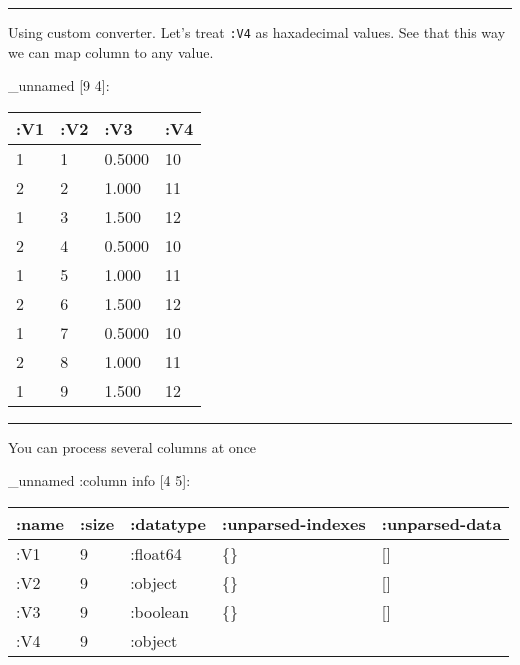 \documentclass[]{article}
\newenvironment{Shaded}{\begin{snugshade}}{\end{snugshade}}
\newcommand{\KeywordTok}[1]{\textcolor[rgb]{0.13,0.29,0.53}{\textbf{#1}}}
\newcommand{\DecValTok}[1]{\textcolor[rgb]{0.00,0.00,0.81}{#1}}
\newcommand{\FloatTok}[1]{\textcolor[rgb]{0.00,0.00,0.81}{#1}}
\newcommand{\VariableTok}[1]{\textcolor[rgb]{0.00,0.00,0.00}{#1}}
\newcommand{\AttributeTok}[1]{\textcolor[rgb]{0.77,0.63,0.00}{#1}}
\newcommand{\NormalTok}[1]{#1}
\begin{document}
\begin{center}\rule{0.5\linewidth}{0.5pt}\end{center}

Using custom converter. Let's treat \texttt{:V4} as haxadecimal values.
See that this way we can map column to any value.

\begin{Shaded}
\end{Shaded}

\_unnamed {[}9 4{]}:

\begin{longtable}[]{@{}llll@{}}
\toprule
:V1 & :V2 & :V3 & :V4\tabularnewline
\midrule
\endhead
1 & 1 & 0.5000 & 10\tabularnewline
2 & 2 & 1.000 & 11\tabularnewline
1 & 3 & 1.500 & 12\tabularnewline
2 & 4 & 0.5000 & 10\tabularnewline
1 & 5 & 1.000 & 11\tabularnewline
2 & 6 & 1.500 & 12\tabularnewline
1 & 7 & 0.5000 & 10\tabularnewline
2 & 8 & 1.000 & 11\tabularnewline
1 & 9 & 1.500 & 12\tabularnewline
\bottomrule
\end{longtable}

\begin{center}\rule{0.5\linewidth}{0.5pt}\end{center}

You can process several columns at once

\begin{Shaded}
\end{Shaded}

\_unnamed :column info {[}4 5{]}:

\begin{longtable}[]{@{}lllll@{}}
\toprule
:name & :size & :datatype & :unparsed-indexes &
:unparsed-data\tabularnewline
\midrule
\endhead
:V1 & 9 & :float64 & \{\} & {[}{]}\tabularnewline
:V2 & 9 & :object & \{\} & {[}{]}\tabularnewline
:V3 & 9 & :boolean & \{\} & {[}{]}\tabularnewline
:V4 & 9 & :object & &\tabularnewline
\bottomrule
\end{longtable}
\end{document}
